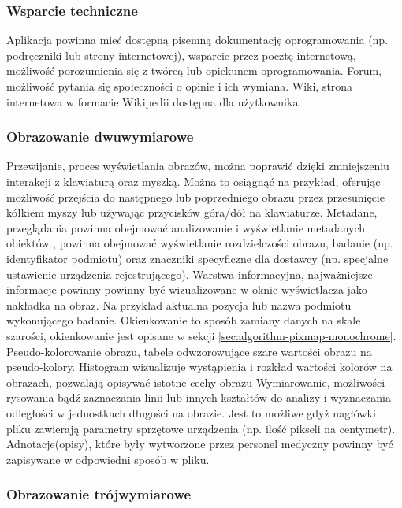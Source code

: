 \subsubsection{Wsparcie techniczne}

Aplikacja powinna mieć dostępną pisemną dokumentację oprogramowania (np. podręczniki lub strony internetowej), wsparcie przez pocztę internetową, możliwość porozumienia się z twórcą lub opiekunem oprogramowania.
Forum, możliwość pytania się społeczności o opinie i ich wymiana.
Wiki, strona internetowa w formacie Wikipedii dostępna dla użytkownika.

\subsubsection{Obrazowanie dwuwymiarowe}

Przewijanie, proces wyświetlania obrazów, można poprawić dzięki zmniejszeniu interakcji z klawiaturą oraz myszką. Można to osiągnąć na przykład, oferując możliwość przejścia do następnego lub poprzedniego obrazu przez przesunięcie kółkiem myszy lub używając przycisków góra/dół na klawiaturze.
Metadane, przeglądania powinna obejmować analizowanie i wyświetlanie metadanych obiektów \DICOM, powinna obejmować wyświetlanie rozdzielczości obrazu, badanie (np. identyfikator podmiotu) oraz znaczniki \DICOM specyficzne dla dostawcy (np. specjalne ustawienie urządzenia rejestrującego).
Warstwa informacyjna, najważniejsze informacje powinny powinny być wizualizowane w oknie wyświetlacza jako nakładka na obraz.
Na przykład aktualna pozycja lub nazwa podmiotu wykonującego badanie.
Okienkowanie to sposób zamiany danych na skale szarości, okienkowanie jest opisane w sekcji \ref{sec:algorithm-pixmap-monochrome}.
Pseudo-kolorowanie obrazu, tabele odwzorowujące szare wartości obrazu na pseudo-kolory.
Histogram wizualizuje wystąpienia i rozkład wartości kolorów na obrazach, pozwalają opisywać istotne cechy obrazu
Wymiarowanie, możliwości rysowania bądź zaznaczania linii lub innych kształtów do analizy i wyznaczania odległości w jednostkach długości na obrazie.
Jest to możliwe gdyż nagłówki pliku \DICOM zawierają parametry sprzętowe urządzenia (np. ilość pikseli na centymetr).
Adnotacje(opisy), które były wytworzone przez personel medyczny powinny być zapisywane w odpowiedni sposób w pliku.

\subsubsection{Obrazowanie trójwymiarowe}

